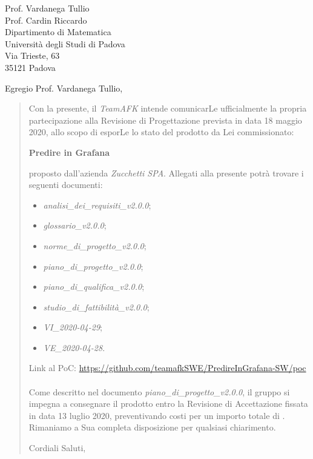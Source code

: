 \begin{letter}{
		Prof. Vardanega Tullio \\
		Prof. Cardin Riccardo \\
		Dipartimento di Matematica \\
		Università degli Studi di Padova \\
		Via Trieste, 63 \\
		35121 Padova}
		
\opening{Egregio Prof. Vardanega Tullio,}

\begin{quotation}
Con la presente, il \textit{TeamAFK} intende comunicarLe ufficialmente la propria partecipazione alla Revisione di Progettazione prevista in data 18 maggio 2020, allo scopo di esporLe lo stato del prodotto da Lei commissionato:

\begin{center}
	\textbf{Predire in Grafana}
\end{center}

\noindent proposto dall'azienda \textit{Zucchetti SPA}.
Allegati alla presente potrà trovare i seguenti documenti:
\begin{itemize}
	\item \textit{analisi\_dei\_requisiti\_v2.0.0};
	
	\item \textit{glossario\_v2.0.0};
	
	\item \textit{norme\_di\_progetto\_v2.0.0};

	\item \textit{piano\_di\_progetto\_v2.0.0};

	\item \textit{piano\_di\_qualifica\_v2.0.0};

	\item \textit{studio\_di\_fattibilità\_v2.0.0};

	\item \textit{VI\_2020-04-29};
	\item \textit{VE\_2020-04-28}.
\end{itemize}
\noindent 
Link al PoC: \href{https://github.com/teamafkSWE/PredireInGrafana-SW/tree/master/poc} {https://github.com/teamafkSWE/PredireInGrafana-SW/poc}\\ \\
Come descritto nel documento \textit{piano\_di\_progetto\_v2.0.0}, il gruppo si impegna a consegnare il prodotto entro la Revisione di Accettazione fissata in data 13 luglio 2020, preventivando costi per un importo totale di \textbf{}.\\
Rimaniamo a Sua completa disposizione per qualsiasi chiarimento.

\vspace{0.5cm}
\closing{ Cordiali Saluti,}
	

\end{quotation}
		
\end{letter}